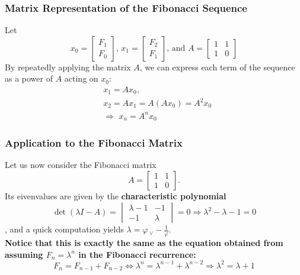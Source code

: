 \documentclass[11pt]{article}
\begin{document}
\subsubsection{Matrix Representation of the Fibonacci Sequence}
Let 
\[
    x_0=\begin{bmatrix}
        F_1\\F_0
    \end{bmatrix}
    \text{, } x_1 =\begin{bmatrix}
        F_2\\F_1
    \end{bmatrix}
    \text{, and }A=\begin{bmatrix}
        1&1\\1&0
    \end{bmatrix}
\]
By repeatedly applying the matrix $A$, we can express each term of the sequence as a power of $A$ acting on $x_0$:
\begin{align*}
    &x_1 = A x_0, \\
    &x_2 = A x_1 = A (A x_0) = A^2 x_0\\
    &\Rightarrow \,\, x_n = A^nx_0
\end{align*}
\subsubsection{Application to the Fibonacci Matrix}
Let us now consider the Fibonacci matrix
\[
    A = \begin{bmatrix} 1 & 1 \\ 1 & 0 \end{bmatrix}.
\]
Its eivenvalues are given by the \textbf{characteristic polynomial}
\[
    \det(\lambda I-A)=\begin{vmatrix}
        \lambda-1 & -1\\-1 & \lambda
    \end{vmatrix}=0 \Rightarrow \boxed{\lambda^2 - \lambda - 1 = 0}
\]
, and a quick computation yields $\displaystyle\lambda = \varphi \,_\lor -\frac{1}{\varphi}$.\\[.5em]
\textbf{Notice that this is exactly the same as the equation obtained from assuming $F_n = \lambda^n$ in the Fibonacci recurrence:}
\[
    F_n = F_{n-1} + F_{n-2} \Leftrightarrow \lambda^n  = \lambda^{n-1} + \lambda^{n-2} \Rightarrow  \boxed{\lambda^2  = \lambda + 1}
\]
\end{document}
